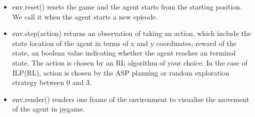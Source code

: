 \begin{itemize}
\item \textsf{env.reset()} resets the game and the agent starts from the starting position. We call it when the agent starts a new episode.
\item \textsf{env.step(action)} returns an observation of taking an action, which include the state location of the agent in terms of x and y coordinates, reward of the state, an boolean value indicating whether the agent reaches an terminal state.
The action is chosen by an RL algorithm of your choice. In the case of ILP(RL), action is chosen by the ASP planning or random exploration strategy between 0 and 3.
\item \textsf{env.render()} renders one frame of the environment to visualise the movement of the agent in pygame.
\end{itemize}
